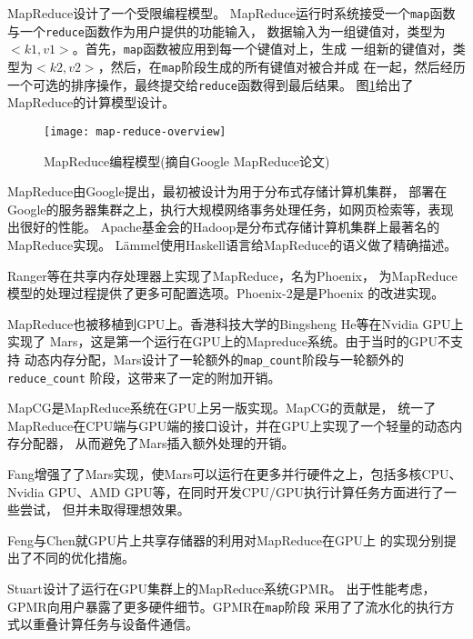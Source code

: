 MapReduce设计了一个受限编程模型。
MapReduce运行时系统接受一个\texttt{map}函数与一个\texttt{reduce}函数作为用户提供的功能输入，
数据输入为一组键值对，类型为$<k1, v1>$。首先，\texttt{map}函数被应用到每一个键值对上，生成
一组新的键值对，类型为$<k2, v2>$，然后，在\texttt{map}阶段生成的所有键值对被合并成
在一起，然后经历一个可选的排序操作，最终提交给\texttt{reduce}函数得到最后结果。
图\ref{fig:map-reduce-overview}给出了MapReduce的计算模型设计。
\begin{figure}
  \centering
  \texttt{[image: map-reduce-overview]}
  \caption[MapReduce编程模型]{MapReduce编程模型(摘自Google MapReduce论文\cite{Dean2008})}
  \label{fig:map-reduce-overview}
\end{figure}

MapReduce由Google提出，最初被设计为用于分布式存储计算机集群，
部署在Google的服务器集群之上，执行大规模网络事务处理任务，如网页检索等，表现出很好的性能。
Apache基金会的Hadoop是分布式存储计算机集群上最著名的MapReduce实现。
L\"ammel使用Haskell语言给MapReduce的语义做了精确描述。

Ranger等在共享内存处理器上实现了MapReduce，名为Phoenix，
为MapReduce模型的处理过程提供了更多可配置选项。Phoenix-2是是Phoenix
的改进实现。

MapReduce也被移植到GPU上。香港科技大学的Bingsheng He等在Nvidia GPU上实现了
Mars，这是第一个运行在GPU上的Mapreduce系统。由于当时的GPU不支持
动态内存分配，Mars设计了一轮额外的\texttt{map\_count}阶段与一轮额外的\texttt{reduce\_count}
阶段，这带来了一定的附加开销。

MapCG是MapReduce系统在GPU上另一版实现。MapCG的贡献是，
统一了MapReduce在CPU端与GPU端的接口设计，并在GPU上实现了一个轻量的动态内存分配器，
从而避免了Mars插入额外处理的开销。

Fang增强了了Mars实现，使Mars可以运行在更多并行硬件之上，包括多核CPU、
Nvidia GPU、AMD GPU等，在同时开发CPU/GPU执行计算任务方面进行了一些尝试，
但并未取得理想效果。

Feng与Chen就GPU片上共享存储器的利用对MapReduce在GPU上
的实现分别提出了不同的优化措施。

Stuart设计了运行在GPU集群上的MapReduce系统GPMR。
出于性能考虑，GPMR向用户暴露了更多硬件细节。GPMR在\texttt{map}阶段
采用了了流水化的执行方式以重叠计算任务与设备件通信。


